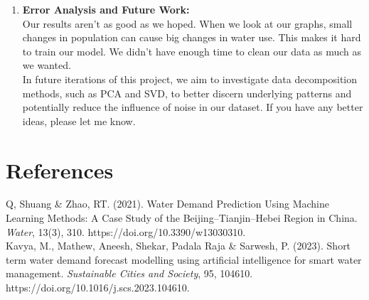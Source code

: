 \documentclass[12pt]{article}
\begin{document}
\begin{enumerate}
    \item \textbf{Error Analysis and Future Work:}\\
    Our results aren't as good as we hoped. When we look at our graphs, small changes in population can cause big changes in water use. 
    This makes it hard to train our model. We didn't have enough time to clean our data as much as we wanted.\\
    In future iterations of this project, we aim to investigate data decomposition methods, such as PCA and SVD, 
    to better discern underlying patterns and potentially reduce the influence of noise in our dataset. If you have any better ideas, please let me know.\\

\end{enumerate}
    


\section*{References}
Q, Shuang \& Zhao, RT. (2021). Water Demand Prediction Using Machine Learning Methods: A Case Study of the Beijing–Tianjin–Hebei Region in China. \textit{Water}, 13(3), 310. https://doi.org/10.3390/w13030310.\\


Kavya, M., Mathew, Aneesh, Shekar, Padala Raja & Sarwesh, P. (2023). Short term water demand forecast modelling using artificial intelligence for smart water management. \textit{Sustainable Cities and Society}, 95, 104610. https://doi.org/10.1016/j.scs.2023.104610.
\end{document}
